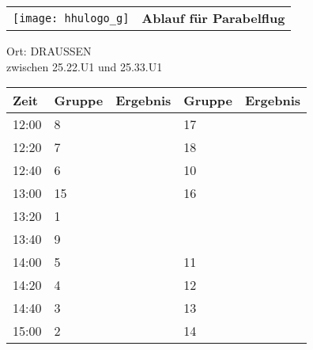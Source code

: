 \documentclass[a4paper,10pt]{article}
\def\spielh{Parabelflug}
\def\raumh{DRAUSSEN}
\begin{document}
  \begin{tabularx}{\textwidth}{lc}
    \texttt{[image: hhulogo\_g]}
  & {\Huge \textbf{Ablauf für \spielh}}
  \end{tabularx}
  \LARGE
  \begin{center}
    \vspace{1cm} 
    Ort: \raumh \\ zwischen 25.22.U1 und 25.33.U1
  \end{center}
    \vspace{2cm} 
    \begin{tabularx}{\textwidth}{X||X|X||X|X}
	\textbf{Zeit} &\textbf{Gruppe} & \textbf{Ergebnis} &\textbf{Gruppe} & \textbf{Ergebnis}  	\\ \hline \hline
	12:00 &	8	&	&17	&	\\ \hline
	12:20 &	7	&	&18	&	\\ \hline
	12:40 &	6	&	&10	&	\\ \hline

	13:00 &	15	&	&16	&	\\ \hline
	13:20 &	1	&	&	&	\\ \hline
	13:40 &	9	&	&	&	\\ \hline

	14:00 &	5	&	&11	&	\\ \hline
	14:20 &	4	&	&12	&	\\ \hline
	14:40 &	3	&	&13	&	\\ \hline

	15:00 &	2	&	&14	&	\\ \hline
      
    \end{tabularx}
   
   \newpage

\end{document}
